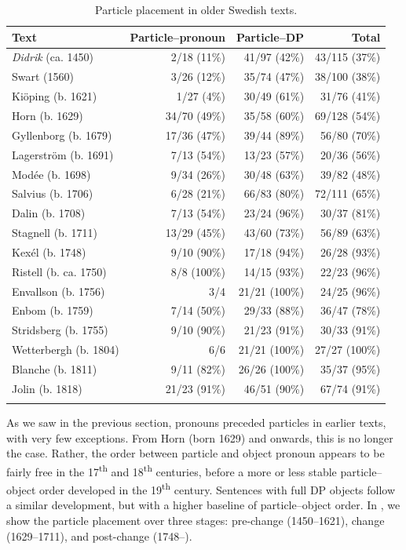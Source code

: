 \documentclass[output=paper]{langscibook}
\begin{document}
\begin{table}
\caption{Particle placement in older Swedish texts.}
\label{tab:lalu:2}
\begin{tabularx}{\textwidth}{Xrrr}
\lsptoprule
Text & Particle–pronoun & Particle–DP & Total\\
\midrule
\textit{Didrik} (ca. 1450) & 2/18 (11\%) & 41/97 (42\%) & 43/115 (37\%)\\
Swart (1560) & 3/26 (12\%) & 35/74 (47\%) & 38/100 (38\%)\\
Kiöping (b. 1621) & 1/27 (4\%) & 30/49 (61\%) & 31/76 (41\%)\\
Horn (b. 1629) & 34/70 (49\%) & 35/58 (60\%) & 69/128 (54\%)\\
Gyllenborg (b. 1679) & 17/36 (47\%) & 39/44 (89\%) & 56/80 (70\%)\\
Lagerström  (b. 1691) & 7/13 (54\%) & 13/23 (57\%) & 20/36 (56\%)\\
Modée (b. 1698) & 9/34 (26\%) & 30/48 (63\%) & 39/82 (48\%)\\
Salvius (b. 1706) & 6/28 (21\%) & 66/83 (80\%) & 72/111 (65\%)\\
Dalin (b. 1708) & 7/13 (54\%) & 23/24 (96\%) & 30/37 (81\%)\\
Stagnell (b. 1711) & 13/29 (45\%) & 43/60 (73\%) & 56/89 (63\%)\\
Kexél (b. 1748) & 9/10 (90\%) & 17/18 (94\%) & 26/28 (93\%)\\
Ristell (b. ca. 1750) & 8/8 (100\%) & 14/15 (93\%) & 22/23 (96\%)\\
Envallson (b. 1756) & 3/4 & 21/21 (100\%) & 24/25 (96\%)\\
Enbom (b. 1759) & 7/14 (50\%) & 29/33 (88\%) & 36/47 (78\%)\\
Stridsberg (b. 1755)  & 9/10 (90\%) & 21/23 (91\%) & 30/33 (91\%)\\
Wetterbergh (b. 1804) & 6/6 & 21/21 (100\%) & 27/27 (100\%)\\
Blanche (b. 1811)  & 9/11 (82\%) & 26/26 (100\%) & 35/37 (95\%)\\
Jolin (b. 1818)  & 21/23 (91\%) & 46/51 (90\%) & 67/74 (91\%)\\
\lspbottomrule
\end{tabularx}
\end{table}

As we saw in the previous section, pronouns preceded particles in earlier texts, with very few exceptions. From Horn (born 1629) and onwards, this is no longer the case. Rather, the order between particle and object pronoun appears to be fairly free in the 17\textsuperscript{th} and 18\textsuperscript{th} centuries, before a more or less stable particle–object order developed in the 19\textsuperscript{th} century. Sentences with full DP objects follow a similar development, but with a higher baseline of particle--object order. In , we show the particle placement over three stages: pre-change (1450–1621), change (1629–1711), and post-change (1748–).
\end{document}
